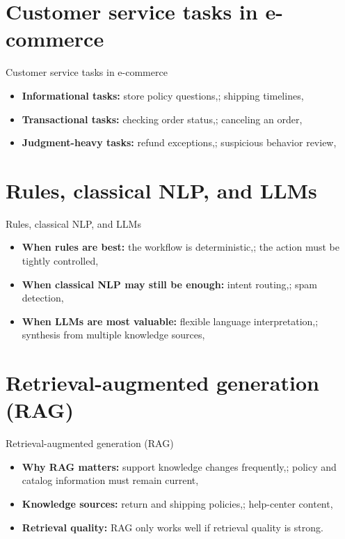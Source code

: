 \documentclass[aspectratio=169]{beamer}
\begin{document}
\section{Customer service tasks in e-commerce}

\begin{frame}{Customer service tasks in e-commerce}
  \begin{itemize}
    \item \textbf{Informational tasks:} store policy questions,; shipping timelines,
    \item \textbf{Transactional tasks:} checking order status,; canceling an order,
    \item \textbf{Judgment-heavy tasks:} refund exceptions,; suspicious behavior review,
  \end{itemize}
\end{frame}

\section{Rules, classical NLP, and LLMs}

\begin{frame}{Rules, classical NLP, and LLMs}
  \begin{itemize}
    \item \textbf{When rules are best:} the workflow is deterministic,; the action must be tightly controlled,
    \item \textbf{When classical NLP may still be enough:} intent routing,; spam detection,
    \item \textbf{When LLMs are most valuable:} flexible language interpretation,; synthesis from multiple knowledge sources,
  \end{itemize}
\end{frame}

\section{Retrieval-augmented generation (RAG)}

\begin{frame}{Retrieval-augmented generation (RAG)}
  \begin{itemize}
    \item \textbf{Why RAG matters:} support knowledge changes frequently,; policy and catalog information must remain current,
    \item \textbf{Knowledge sources:} return and shipping policies,; help-center content,
    \item \textbf{Retrieval quality:} RAG only works well if retrieval quality is strong.
  \end{itemize}
\end{frame}
\end{document}
